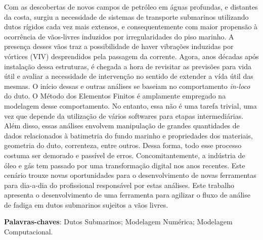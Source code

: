 
\setlength{\absparsep}{18pt} %
\begin{resumo}

    Com as descobertas de novos campos de petróleo em águas profundas, e distantes da costa, surgiu a necessidade de sistemas de transporte submarinos utilizando dutos rígidos cada vez mais extensos, e consequentemente com maior propensão à ocorrência de vãos-livres induzidos por irregularidades do piso marinho.
    A presença desses vãos traz a possibilidade de haver vibrações induzidas por vórtices (VIV) desprendidos pela passagem da corrente.
    Agora, anos décadas após instalação dessa estruturas, é chegada a hora de revisitar as previsões para vida útil e avaliar a necessidade de intervenção no sentido de extender a vída útil das mesmas.
    O início dessas e outras análises se baseiam no comportamento \textit{in-loco} do duto.
    O Método dos Elementos Finitos é amplamente empregado na modelagem desse comportamento.
    No entanto, essa não é uma tarefa trivial, uma vez que depende da utilização de vários softwares para etapas intermediárias.
    Além disso, essas análises envolvem manipulação de grandes quantidades de dados relacionados à batimetria do fundo marinho e propriedades dos materiais, geometria do duto, correnteza, entre outros.
    Dessa forma, todo esse processo costuma ser demorado e passível de erros.
    Concomitantemente, a indústria de óleo e gás tem passado por uma transformação digital nos anos recentes. Este cenário trouxe novas oportunidades para o desenvolvimento de novas ferramentas para dia-a-dia do profissional responsável por estas análises.
    Este trabalho apresenta o desenvolvimento de uma ferramenta para agilizar o fluxo de análise de fadiga em dutos submarinos sujeitos a vãos livres.
    

 \textbf{Palavras-chaves}: Dutos Submarinos; Modelagem Numérica; Modelagem Computacional.
\end{resumo}


